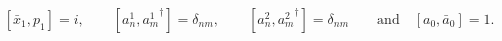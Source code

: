 \begin{equation}
\left[ \bar{x}_1, p_1 \right] = i, 
\qquad 
\left[ a^1_n, {a^1_m}^\dagger \right] =  \delta_{nm}, 
\qquad  \left[ a^2_n, {a^2_m}^\dagger \right] = \delta_{nm} 
\qquad \textrm{and} \quad \left[ a_0, {\bar{a}_0} \right] = 1.
\end{equation}

